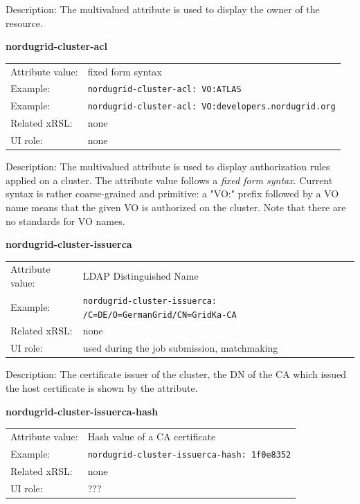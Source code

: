 \documentclass{article}
\begin{document}
Description: The multivalued attribute is used to display the owner of the resource.


  \hspace*{0.5cm}
  \begin{shaded}
    \textbf{nordugrid-cluster-acl}
  \end{shaded}
  \begin{tabular}{lp{10cm}}  
    Attribute value:& fixed form syntax\\
    Example:& \verb#nordugrid-cluster-acl: VO:ATLAS#\\
    Example:& \verb#nordugrid-cluster-acl: VO:developers.nordugrid.org#\\
    Related xRSL:& none\\
    UI role:& none\\
  \end{tabular}

Description: The multivalued attribute is used to display authorization rules 
applied on a cluster. The attribute value follows a {\it fixed form syntax}.
Current syntax is rather coarse-grained and primitive: a "VO:" prefix followed by a VO name 
means that the given VO is authorized on the cluster. 
Note that there are no standards for VO names.


  \hspace*{0.5cm}
  \begin{shaded}
    \textbf{nordugrid-cluster-issuerca}
  \end{shaded}
  \begin{tabular}{lp{10cm}}  
    Attribute value:& LDAP Distinguished Name\\
    Example:& \verb#nordugrid-cluster-issuerca: /C=DE/O=GermanGrid/CN=GridKa-CA#\\
    Related xRSL:& none\\
    UI role:& used during the job submission, matchmaking\\
  \end{tabular}

Description: The certificate issuer of the cluster, 
the DN of the CA which issued the host certificate is shown by the attribute.


  \hspace*{0.5cm}
  \begin{shaded}
    \textbf{nordugrid-cluster-issuerca-hash}
  \end{shaded}
  \begin{tabular}{lp{10cm}}  
    Attribute value:& Hash value of a CA certificate\\
    Example:& \verb#nordugrid-cluster-issuerca-hash: 1f0e8352#\\
    Related xRSL:& none\\
    UI role:& ???\\
  \end{tabular}
\end{document}
